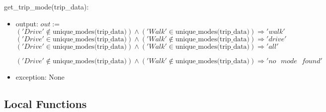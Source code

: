 \documentclass[12pt, titlepage]{article}
\begin{document}
get\_trip\_mode(trip\_data):
\begin{itemize}
\item output: \newline
$out :=$ \newline $('Drive' \notin \text{unique\_modes(trip\_data)}) \land  ('Walk' \in \text{unique\_modes(trip\_data)}) \Rightarrow 'walk' $ \newline
$('Drive' \in \text{unique\_modes(trip\_data)}) \land  ('Walk' \notin \text{unique\_modes(trip\_data)}) \Rightarrow 'drive' $ \newline
$('Drive' \in \text{unique\_modes(trip\_data)}) \land  ('Walk' \in \text{unique\_modes(trip\_data)}) \Rightarrow 'all' $

$('Drive' \notin \text{unique\_modes(trip\_data)}) \land  ('Walk' \notin \text{unique\_modes(trip\_data)}) \Rightarrow 'no\text{ }mode\text{ }found' $
\item exception: None
\end{itemize}

\subsection{Local Functions}
\end{document}
